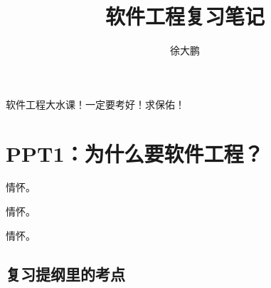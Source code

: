\documentclass[14pt, letterpaper, UTF8, fontset=windowsnew, heading=true]{article}
\title{软件工程复习笔记}
\author{徐大鹏}
\begin{document}
\maketitle

软件工程大水课！一定要考好！求保佑！

\section{PPT1：为什么要软件工程？}

情怀。
\par
情怀。
\par
情怀。


\subsection{复习提纲里的考点}
\end{document}

